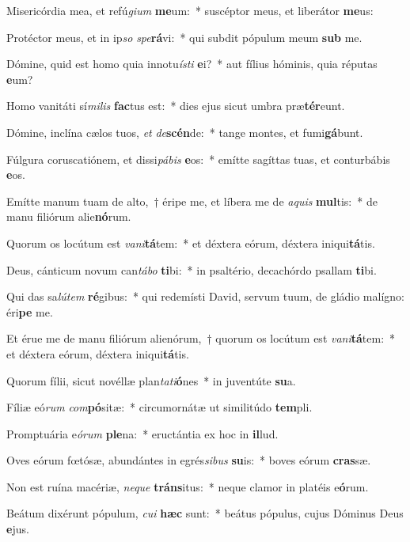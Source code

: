 \item Misericórdia mea, et refú\textit{gi}\textit{um} \textbf{me}um:~* suscéptor meus, et liberátor \textbf{me}us:
\item Protéctor meus, et in ip\textit{so} \textit{spe}\textbf{rá}vi:~* qui subdit pópulum meum \textbf{sub} me.
\item Dómine, quid est homo quia innotu\textit{ís}\textit{ti} \textbf{e}i?~* aut fílius hóminis, quia réputas \textbf{e}um?
\item Homo vanitáti sí\textit{mi}\textit{lis} \textbf{fac}tus est:~* dies ejus sicut umbra præ\textbf{tér}eunt.
\item Dómine, inclína cælos tuos, \textit{et} \textit{de}\textbf{scén}de:~* tange montes, et fumi\textbf{gá}bunt.
\item Fúlgura coruscatiónem, et dissi\textit{pá}\textit{bis} \textbf{e}os:~* emítte sagíttas tuas, et conturbábis \textbf{e}os.
\item Emítte manum tuam de alto,~† éripe me, et líbera me de \textit{a}\textit{quis} \textbf{mul}tis:~* de manu filiórum alie\textbf{nó}rum.
\item Quorum os locútum est \textit{va}\textit{ni}\textbf{tá}tem:~* et déxtera eórum, déxtera iniqui\textbf{tá}tis.
\item Deus, cánticum novum can\textit{tá}\textit{bo} \textbf{ti}bi:~* in psaltério, decachórdo psallam \textbf{ti}bi.
\item Qui das sa\textit{lú}\textit{tem} \textbf{ré}gibus:~* qui redemísti David, servum tuum, de gládio malígno: éri\textbf{pe} me.
\item Et érue me de manu filiórum alienórum,~† quorum os locútum est \textit{va}\textit{ni}\textbf{tá}tem:~* et déxtera eórum, déxtera iniqui\textbf{tá}tis.
\item Quorum fílii, sicut novéllæ plan\textit{ta}\textit{ti}\textbf{ó}nes~* in juventúte \textbf{su}a.
\item Fíliæ eó\textit{rum} \textit{com}\textbf{pó}sitæ:~* circumornátæ ut similitúdo \textbf{tem}pli.
\item Promptuária e\textit{ó}\textit{rum} \textbf{ple}na:~* eructántia ex hoc in \textbf{il}lud.
\item Oves eórum fœtósæ, abundántes in egrés\textit{si}\textit{bus} \textbf{su}is:~* boves eórum \textbf{cras}sæ.
\item Non est ruína macériæ, \textit{ne}\textit{que} \textbf{tráns}itus:~* neque clamor in platéis e\textbf{ó}rum.
\item Beátum dixérunt pópulum, \textit{cu}\textit{i} \textbf{hæc} sunt:~* beátus pópulus, cujus Dóminus Deus \textbf{e}jus.
